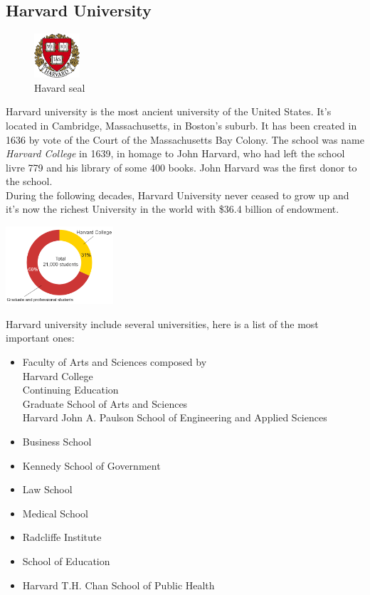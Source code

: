 \documentclass[10pt,a4paper]{article}
\begin{document}
\subsection{Harvard University}


\begin{figure}
\centering
\includegraphics[width=0.15\textwidth]{harvardlogo.png}
\caption*{Havard seal}
\end{figure}
Harvard university is the most ancient university of the United States. It's located in Cambridge, Massachusetts, in Boston's suburb. It has been created in 1636 by vote of the Court of the Massachusetts Bay Colony. The school was name \textit{Harvard College} in 1639, in homage to John Harvard, who had left the school livre 779 and his library of some 400 books. John Harvard was the first donor to the school.\\
During the following decades, Harvard University never ceased to grow up and it's now the richest University in the world with \$36.4 billion of endowment.


\includegraphics[width=0.3\textwidth]{images/fig1.png}

Harvard university include several universities, here is a list of the most important ones:\\
\begin{itemize}
  \item Faculty of Arts and Sciences composed by \\Harvard College \\Continuing Education \\Graduate School of Arts and Sciences \\Harvard John A. Paulson School of Engineering and Applied Sciences
\item Business School
\item Kennedy School of Government
\item Law School
\item Medical School
\item Radcliffe Institute
\item School of Education
\item Harvard T.H. Chan School of Public Health
\end{itemize}
\end{document}
